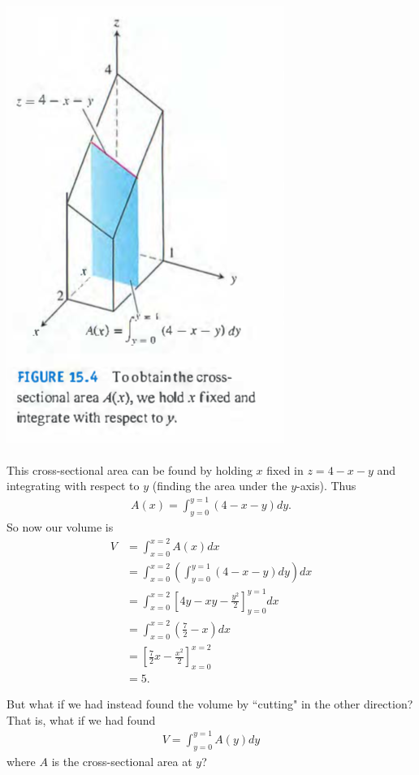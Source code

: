 \documentclass[12pt, letter]{article}
\theoremstyle{plain}
\numberwithin{theorem}{section}
\theoremstyle{definition}
\begin{document}
\bigskip

\begin{center}
\includegraphics[scale=0.7]{m3_f2}
\end{center}

\bigskip

This cross-sectional area can be found by holding $x$ fixed in $z=4-x-y$ and integrating with respect to $y$ (finding the area under the $y$-axis). Thus
\begin{align*}
A(x) = \int_{y=0}^{y=1} (4-x-y) dy.
\end{align*}
So now our volume is
\begin{align*}
V &= \int_{x=0}^{x=2} A(x) dx\\
&= \int_{x=0}^{x=2} \left(\int_{y=0}^{y=1} (4-x-y)dy \right) dx\\
&= \int_{x=0}^{x=2} \left[ 4y-xy-\frac{y^2}{2}\right]_{y=0}^{y=1} dx\\
&= \int_{x=0}^{x=2} \left(\frac{7}{2} - x\right)dx\\
&= \left[ \frac{7}{2}x-\frac{x^2}{2} \right]_{x=0}^{x=2}\\
&=5.
\end{align*}

\bigskip

But what if we had instead found the volume by ``cutting" in the other direction? That is, what if we had found
\begin{align*}
V = \int_{y=0}^{y=1} A(y)dy
\end{align*}
where $A$ is the cross-sectional area at $y$?
\end{document}
